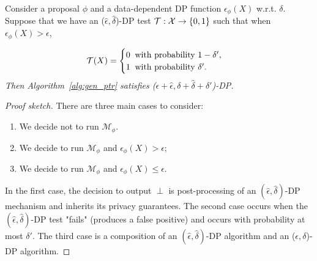 
\begin{theorem}
\label{thm:gen_ptr}
Consider a proposal $\phi$ and a data-dependent DP function $\epsilon_{\phi}(X)$ w.r.t. $\delta$. Suppose that we have an ($\hat{\epsilon}, \hat{\delta}$)-DP test $\mathcal{T}: \mathcal{X} \rightarrow \{0, 1\}$ such that when $\epsilon_{\phi}(X) > \epsilon$, \end{theorem}
\vspace{-8mm}
\begin{align*}
    \cT(X) =
    \begin{cases}
        0  \text{ \:with probability } 1 - \delta', \\
        1  \text{\: with probability }  \delta'. %
    \end{cases}
\end{align*}
\textit{Then Algorithm~\ref{alg:gen_ptr} satisfies ($\epsilon + \hat{\epsilon}, \delta +  \hat{\delta} + \delta'$)-DP. }
 \begin{proof}[Proof sketch]
 There are three main cases to consider:
\begin{enumerate}
    \item We decide not to run $\mathcal{M}_{\phi}$.   %
    \item We decide to run $\mathcal{M}_{\phi}$ and $\epsilon_{\phi}(X) > \epsilon$;    %
    \item We decide to run $\mathcal{M}_{\phi}$ and $\epsilon_{\phi}(X) \leq \epsilon$.    %
\end{enumerate}%
In the first case, the decision to output $\perp$ is post-processing of an $(\hat{\epsilon}, \hat{\delta})$-DP mechanism and inherits its privacy guarantees. The second case occurs when the $(\hat{\epsilon}, \hat{\delta})$-DP test "fails" (produces a false positive) and occurs with probability at most $\delta'$. The third case is a composition of an $(\hat{\epsilon}, \hat{\delta})$-DP algorithm and an ($\epsilon, \delta$)-DP algorithm.
 \end{proof}
 

